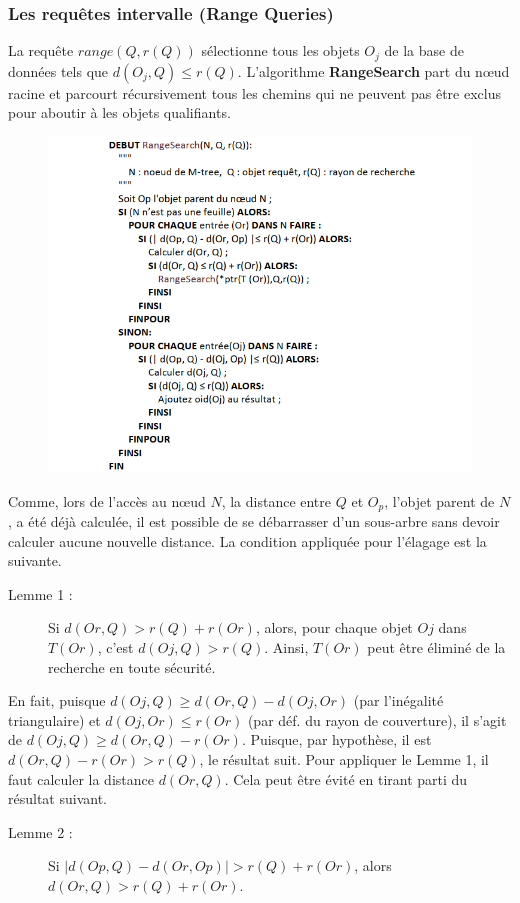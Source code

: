 \subsubsection{Les requêtes intervalle (Range Queries)}
La requête $ range(Q, r(Q)) $ sélectionne tous les objets $ O_j $ de la base de données tels que $ d(O_j, Q) \le r(Q) $. L'algorithme \textbf{RangeSearch} part du nœud racine et parcourt récursivement tous les chemins qui ne peuvent pas être exclus pour aboutir à les objets qualifiants.
\begin{figure}[H]
	\centering
	\includegraphics[width=.9 \textwidth]{Figures/rangesearxh.png} %
\end{figure} 

Comme, lors de l'accès au nœud $ N $, la distance entre $ Q $ et $ O_p $, l'objet parent de $ N $, a été déjà calculée, il est possible de se débarrasser d'un sous-arbre sans devoir calculer aucune nouvelle distance. La condition appliquée pour l'élagage est la suivante.
\begin{description}
	\item[Lemme 1 :] Si $ d(Or, Q) > r(Q) + r(Or) $, alors, pour chaque objet $ Oj  $ dans $ T (Or) $, c'est $ d(Oj, Q) > r(Q) $. Ainsi, $ T (Or) $ peut être éliminé de la recherche en toute sécurité.
\end{description}
En fait, puisque $ d(Oj, Q) \ge d(Or, Q) - d(Oj, Or) $ (par l'inégalité triangulaire) et $ d(Oj, Or) \le r(Or) $ (par déf. du rayon de couverture), il s'agit de $ d(Oj, Q) \ge d(Or, Q)-r(Or) $.
Puisque, par hypothèse, il est $ d(Or, Q) - r(Or) > r(Q) $, le résultat suit.
Pour appliquer le Lemme 1, il faut calculer la distance $ d(Or, Q) $. Cela peut être évité en tirant parti du résultat suivant.
\begin{description}
	\item[Lemme 2 :]  Si $ | d(Op, Q) - d(Or, Op) |> r(Q) + r(Or) $, alors $ d(Or, Q) > r(Q) + r(Or) $.
\end{description}

